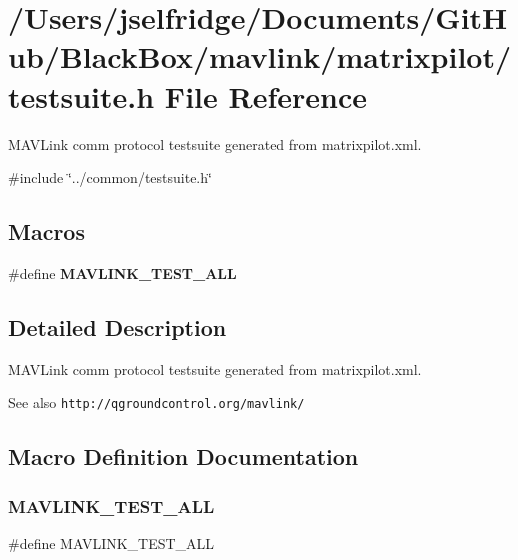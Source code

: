 \section{/\+Users/jselfridge/\+Documents/\+Git\+Hub/\+Black\+Box/mavlink/matrixpilot/testsuite.h File Reference}
\label{matrixpilot_2testsuite_8h}


M\+A\+V\+Link comm protocol testsuite generated from matrixpilot.\+xml.  


{\ttfamily \#include \char`\"{}../common/testsuite.\+h\char`\"{}}\newline
\subsection*{Macros}
\begin{DoxyCompactItemize}
\item 
\#define \textbf{ M\+A\+V\+L\+I\+N\+K\+\_\+\+T\+E\+S\+T\+\_\+\+A\+LL}
\end{DoxyCompactItemize}


\subsection{Detailed Description}
M\+A\+V\+Link comm protocol testsuite generated from matrixpilot.\+xml. 

\begin{DoxySeeAlso}{See also}
{\tt http\+://qgroundcontrol.\+org/mavlink/} 
\end{DoxySeeAlso}


\subsection{Macro Definition Documentation}
\mbox{\label{matrixpilot_2testsuite_8h_ae706a993ca59ccc1a8a7c330f0b1ceec}} 
\subsubsection{M\+A\+V\+L\+I\+N\+K\+\_\+\+T\+E\+S\+T\+\_\+\+A\+LL}
{\footnotesize\ttfamily \#define M\+A\+V\+L\+I\+N\+K\+\_\+\+T\+E\+S\+T\+\_\+\+A\+LL}


